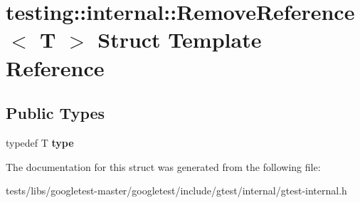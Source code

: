 \hypertarget{structtesting_1_1internal_1_1RemoveReference}{}\section{testing\+:\+:internal\+:\+:Remove\+Reference$<$ T $>$ Struct Template Reference}
\label{structtesting_1_1internal_1_1RemoveReference}
\subsection*{Public Types}
\begin{DoxyCompactItemize}
\item 
\mbox{\label{structtesting_1_1internal_1_1RemoveReference_a9ca4f6499579225f7986b789ee4b2895}} 
typedef T {\bfseries type}
\end{DoxyCompactItemize}


The documentation for this struct was generated from the following file\+:\begin{DoxyCompactItemize}
\item 
tests/libs/googletest-\/master/googletest/include/gtest/internal/gtest-\/internal.\+h\end{DoxyCompactItemize}

